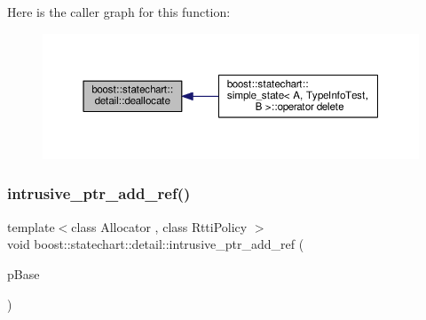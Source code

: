 Here is the caller graph for this function\+:
\nopagebreak
\begin{figure}[H]
\begin{center}
\leavevmode
\includegraphics[width=350pt]{namespaceboost_1_1statechart_1_1detail_a2137e00f346972cc349b4eb44a806213_icgraph}
\end{center}
\end{figure}
\mbox{\label{namespaceboost_1_1statechart_1_1detail_ae61199991db81ca38c21e4b657993be5}} 
\subsubsection{\texorpdfstring{intrusive\+\_\+ptr\+\_\+add\+\_\+ref()}{intrusive\_ptr\_add\_ref()}}
{\footnotesize\ttfamily template$<$class Allocator , class Rtti\+Policy $>$ \\
void boost\+::statechart\+::detail\+::intrusive\+\_\+ptr\+\_\+add\+\_\+ref (\begin{DoxyParamCaption}\item[{const \+::\mbox{\hyperlink{classboost_1_1statechart_1_1detail_1_1state__base}{boost\+::statechart\+::detail\+::state\+\_\+base}}$<$ Allocator, Rtti\+Policy $>$ $\ast$}]{p\+Base }\end{DoxyParamCaption})\hspace{0.3cm}{\ttfamily [inline]}}

\mbox{\label{namespaceboost_1_1statechart_1_1detail_a783126c1ee44ec8984ee4d89b0aa1eac}} 

